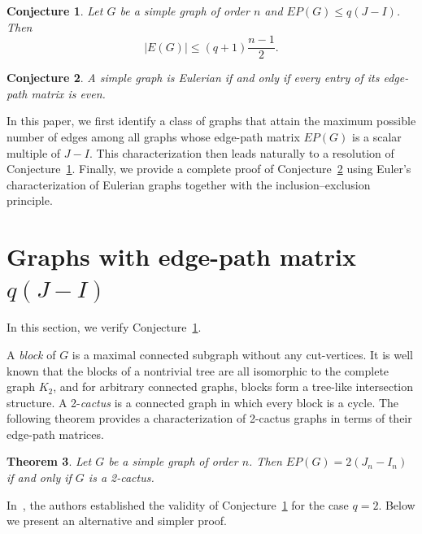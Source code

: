 \documentclass{article}
\newtheorem{theorem}{Theorem}[section]
\newtheorem{conjecture}[theorem]{Conjecture}
\begin{document}
\begin{conjecture}\cite{Akbari}\label{C-1}
Let $G$ be a simple graph of order $n$ and $EP(G) \leq q(J-I)$. Then 
$$|E(G)|\leq 
    (q+1)\frac{n-1}{2}.$$
\end{conjecture}

\begin{conjecture}\cite{Akbari}\label{C-2}
A simple graph is Eulerian if and only if every entry of its edge-path matrix is even. 
\end{conjecture}

In this paper, we first identify a class of graphs that attain the maximum possible number of edges among all graphs whose edge-path matrix \(EP(G)\) is a scalar multiple of \(J - I\). This characterization then leads naturally to a resolution of Conjecture~\ref{C-1}. Finally, we provide a complete proof of Conjecture~\ref{C-2} using Euler's characterization of Eulerian graphs together with the inclusion–exclusion principle.

\section{Graphs with edge-path matrix $q(J-I)$ }

In this section, we verify Conjecture~\ref{C-1}.

A {\it block} of \( G \) is a maximal connected subgraph without any cut-vertices. It is well known that the blocks of a nontrivial tree are all isomorphic to the complete graph \( K_2 \), and for arbitrary connected graphs, blocks form a tree-like intersection structure. A 2-{\it cactus} is a connected graph in which every block is a cycle. The following theorem provides a characterization of 2-cactus graphs in terms of their edge-path matrices.

\begin{theorem}\cite{Akbari}\label{T-1}
Let $G$ be a simple graph of order $n$. Then $EP(G) = 2(J_n-I_n)$ if and only if
$G$ is a 2-cactus.
\end{theorem}

In~\cite{Akbari}, the authors established the validity of Conjecture~\ref{C-1} for the case $q=2$. Below we present an alternative and simpler proof.
\end{document}
